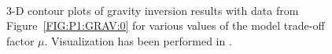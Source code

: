 \begin{figure}
\begin{center}
{        }\\ %
    \end{center}
    \caption{3-D contour plots of gravity inversion results with data from
    Figure~\ref{FIG:P1:GRAV:0} for various values of the model trade-off
    factor $\mu$. Visualization has been performed in \VisIt.}
    \label{FIG:P1:GRAV:10}
\end{figure}

